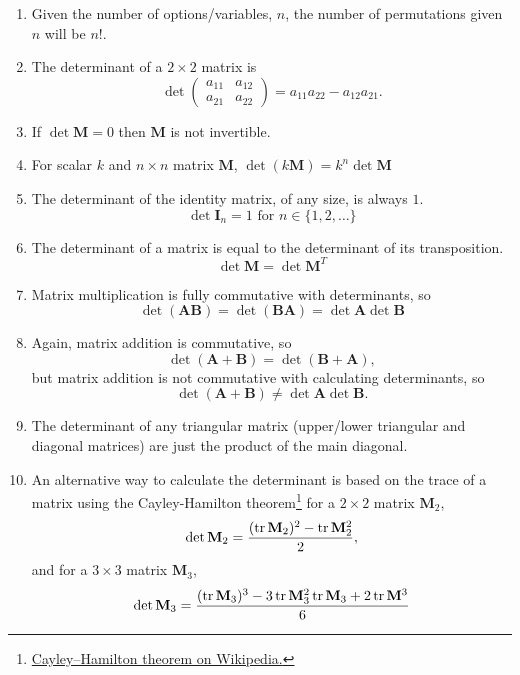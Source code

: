 \documentclass[12pt]{article}
\newcommand{\mat}[1]{\mathbf{#1}}
\begin{document}
\begin{enumerate}
\item Given the number of options/variables, $n$, the number of permutations given $n$ will be $n!$.
\item The determinant of a $2 \times 2$ matrix is
\begin{equation}
\det \begin{pmatrix}
  a_{11} & a_{12} \\
  a_{21} & a_{22}
\end{pmatrix} = a_{11} a_{22} - a_{12} a_{21}.
\end{equation}
\item If $\det \mat{M} = 0$ then $\mat{M}$ is not invertible.
\item For scalar $k$ and $n \times n$ matrix $\mat{M}$, $\det ( k \mat{M} ) = k^{n} \det \mat{M}$
\item The determinant of the identity matrix, of any size, is always $1$.
\begin{equation}
\det \mat{I}_{n} = 1 \text{ for } n \in \{ 1, 2, \dots  \}
\end{equation}
\item The determinant of a matrix is equal to the determinant of its transposition. 
\begin{equation}
\det \mat{M} = \det \mat{M}^{T}
\end{equation}
\item Matrix multiplication is fully commutative with determinants, so
\begin{equation}
\det ( \mat{AB} ) = \det ( \mat{BA} ) = \det \mat{A} \det \mat {B}
\end{equation}
\item Again, matrix addition is commutative, so 
\begin{equation}
\det ( \mat{A} + \mat{B} ) = \det ( \mat{B} + \mat{A} ),
\end{equation}
but matrix addition is not commutative with calculating determinants, so
\begin{equation}
\det ( \mat{A} + \mat{B} ) \neq \det \mat{A} \det \mat{B}.
\end{equation}
\item The determinant of any triangular matrix (upper/lower triangular and diagonal matrices) are just the product of the main diagonal.
\item An alternative way to calculate the determinant is based on the trace of a matrix using the Cayley-Hamilton theorem\footnote{\href{https://en.wikipedia.org/wiki/Cayley\%E2\%80\%93Hamilton_theorem}{Cayley–Hamilton theorem on Wikipedia.}} for a $2 \times 2$ matrix $\mat{M}_{2}$,
\begin{equation}
\det \mat{M}_{2} = \frac{ (\tr \mat{M}_{2})^{2} - \tr \mat{M}_{2}^{2} }{2},
\end{equation}
and for a $3 \times 3$ matrix $\mat{M}_{3}$,
\begin{equation}
\det \mat{M}_{3} = \frac{ (\tr \mat{M}_{3})^3 - 3\tr \mat{M}_{3}^2 \tr \mat{M}_{3} + 2 \tr \mat{M}^3 }{6}
\end{equation} 
\end{enumerate}
\end{document}
